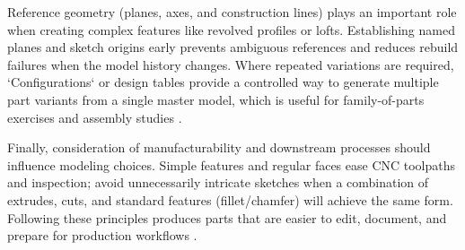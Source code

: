Reference geometry (planes, axes, and construction lines) plays an important role when creating complex features like revolved profiles or lofts. Establishing named planes and sketch origins early prevents ambiguous references and reduces rebuild failures when the model history changes. Where repeated variations are required, `Configurations` or design tables provide a controlled way to generate multiple part variants from a single master model, which is useful for family-of-parts exercises and assembly studies \cite{lab_01_dassault_official}.

Finally, consideration of manufacturability and downstream processes should influence modeling choices. Simple features and regular faces ease CNC toolpaths and inspection; avoid unnecessarily intricate sketches when a combination of extrudes, cuts, and standard features (fillet/chamfer) will achieve the same form. Following these principles produces parts that are easier to edit, document, and prepare for production workflows \cite{lab_01_cad_fundamentals,lab_01_solidworks_bible}.
